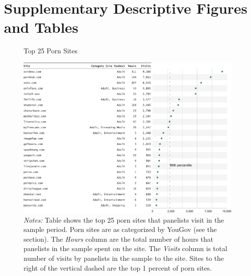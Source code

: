 \documentclass[12pt, letterpaper]{article}
\begin{document}
\section{Supplementary Descriptive Figures and Tables}
\begin{figure}[ht]
	\centering
	\caption{Top 25 Porn Sites}
	\includegraphics[width=\textwidth]{../figs/top_25_adultsites.pdf}
	\caption*{\footnotesize \emph{Notes:} 
		Table shows the top 25 porn sites that panelists visit in the sample period.
		Porn sites are as categorized by YouGov (see the  section).
		The \emph{Hours} column are the total number of hours that panelists in the sample spent on the site. 
		The \emph{Visits} column is total number of visits by panelists in the sample to the site.  
		Sites to the right of the vertical dashed are the top 1 percent of porn sites.
	}
	\label{fig:top25_adult}
\end{figure}
\end{document}

